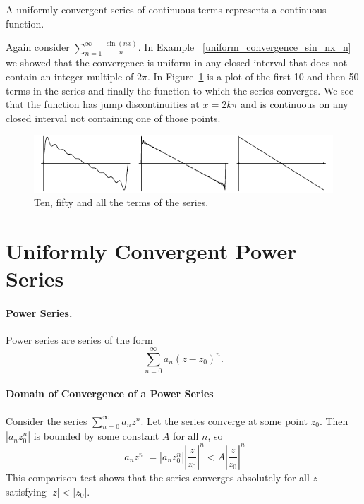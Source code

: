\begin{Result}
  \label{unif_cont}
  A uniformly convergent series of continuous terms represents a continuous 
  function.
\end{Result}




\begin{Example}
  Again consider $\sum_{n = 1}^\infty \frac{\sin(n x)}{n}$.  In Example
  ~\ref{uniform_convergence_sin_nx_n} we showed that the convergence
  is uniform in any closed interval that does not contain an integer
  multiple of $2 \pi$.  In Figure~\ref{sinnx_n} is a plot of the first
  10 and then 50 terms in the series and finally the function to which
  the series converges.  We see that the function has jump
  discontinuities at $x = 2 k \pi$ and is continuous on any closed
  interval not containing one of those points.

  \begin{figure}[htb!]
    \begin{center}
      \includegraphics[width=\textwidth]{fcv/series/sinnx_n}
    \end{center}
    \caption{Ten, fifty and all the terms of the series.}
    \label{sinnx_n}
  \end{figure}

\end{Example}




\section{Uniformly Convergent Power Series}


\paragraph{Power Series.}
Power series are series of the form
\[ 
\sum_{n = 0}^\infty a_n (z - z_0)^n.
\]



\paragraph{Domain of Convergence of a Power Series}
Consider the series $\sum_{n = 0}^{\infty} a_n z^n$.  Let the series converge
at some point $z_0$.  Then $|a_n z_0^n|$ is bounded by some constant $A$ for
all $n$, so
\[ 
|a_n z^n| = |a_n z_0^n| \left| \frac{z}{z_0} \right|^n 
< A \left| \frac{z}{z_0} \right|^n 
\]
This comparison test shows that the series converges absolutely for all $z$
satisfying $|z| < |z_0|$.

